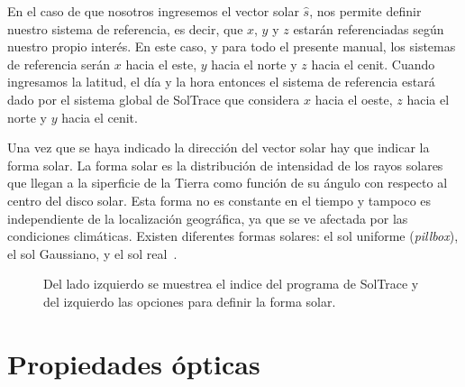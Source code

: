 \documentclass[12pt, spanish]{article}
\theoremstyle{problemstyle}
\begin{document}
En el caso de que nosotros ingresemos el vector solar $\hat s$, nos permite definir nuestro sistema de referencia, es decir, que $x$, $y$ y $z$ estarán referenciadas según nuestro propio interés. En este caso, y para todo el presente manual, los sistemas de referencia serán $x$ hacia el este, $y$ hacia el norte y $z$ hacia el cenit. Cuando ingresamos la latitud, el día y la hora entonces el sistema de referencia estará dado por el sistema global de SolTrace que considera $x$ hacia el oeste, $z$ hacia el norte y $y$ hacia el cenit.

Una vez que se haya indicado la dirección del vector solar hay que indicar la forma solar. La forma solar es la distribución de intensidad de los rayos solares que llegan a la siperficie de la Tierra como función de su ángulo con respecto al centro del disco solar. Esta forma no es constante en el tiempo y tampoco es independiente de la localización geográfica, ya que se ve afectada por las condiciones climáticas. Existen diferentes formas solares: el sol uniforme (\emph{pillbox}), el sol Gaussiano, y el sol real~\citep{Buie2003sunshape}. 

\begin{figure}[h!]
  \centering
  \caption{\label{fig:soltrace} Del lado izquierdo se muestrea el indice del programa de SolTrace y del izquierdo las opciones para definir la forma solar.}
\end{figure}

\section{Propiedades ópticas}
\label{sec:opticas}
\end{document}
